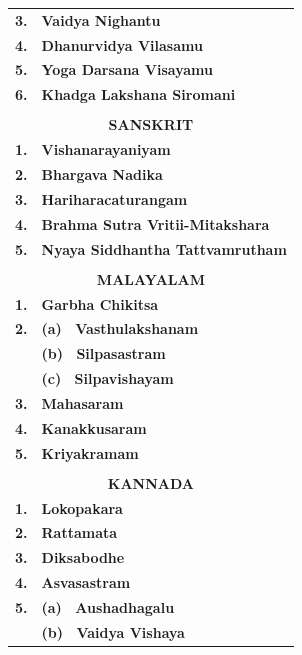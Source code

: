\documentclass[11pt, openany]{book}
\begin{document}
\begin{table}[h!]
\englishfont\centering
\begin{tabular}{rl}
 \textbf{\small 3.}& \textbf{\small Vaidya Nighantu}\\
 \textbf{\small 4.}& \textbf{\small Dhanurvidya Vilasamu}\\
 \textbf{\small 5.}& \textbf{\small Yoga Darsana Visayamu}\\
 \textbf{\small 6.}& \textbf{\small Khadga Lakshana Siromani}\\
&\\
\multicolumn{2}{c}{\textbf{ SANSKRIT}}         \\
\textbf{\small 1.} & \textbf{\small Vishanarayaniyam }               \\
\textbf{\small 2.} & \textbf{\small Bhargava Nadika  }               \\
\textbf{\small 3.} & \textbf{\small Hariharacaturangam }             \\
\textbf{\small 4.} & \textbf{\small Brahma Sutra Vritii-Mitakshara }\\
\textbf{\small 5.} & \textbf{\small Nyaya Siddhantha Tattvamrutham }\\
&\\
 \multicolumn{2}{c}{\textbf{ MALAYALAM}}\\
 \textbf{\small 1.}& \textbf{\small Garbha Chikitsa}\\
 \textbf{\small 2.} &\textbf{\small (a)~ Vasthulakshanam}\\
 &\textbf{\small (b)~ Silpasastram}\\
 &\textbf{\small (c)~ Silpavishayam}\\
 \textbf{\small 3.}& \textbf{\small Mahasaram}\\
 \textbf{\small 4.}& \textbf{\small Kanakkusaram}\\
 \textbf{\small 5.}& \textbf{\small Kriyakramam}\\
&\\
 \multicolumn{2}{c}{\textbf{ KANNADA}}\\
 \textbf{\small 1.}& \textbf{\small Lokopakara}\\
 \textbf{\small 2.}& \textbf{\small Rattamata}\\
 \textbf{\small 3.}& \textbf{\small Diksabodhe}\\
 \textbf{\small 4.}& \textbf{\small Asvasastram}\\
 \textbf{\small 5.}& \textbf{\small (a)~ Aushadhagalu}\\
 &\textbf{\small (b)~ Vaidya Vishaya}\\

\end{tabular}
\end{table}
\end{document}
